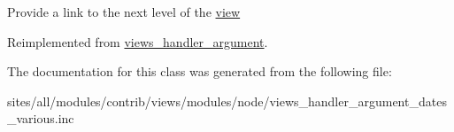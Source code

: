 Provide a link to the next level of the \hyperlink{classview}{view} 

Reimplemented from \hyperlink{classviews__handler__argument_76181ac24e7be4a09aaafc1fa5f15ea1}{views\_\-handler\_\-argument}.

The documentation for this class was generated from the following file:\begin{CompactItemize}
\item 
sites/all/modules/contrib/views/modules/node/views\_\-handler\_\-argument\_\-dates\_\-various.inc\end{CompactItemize}
